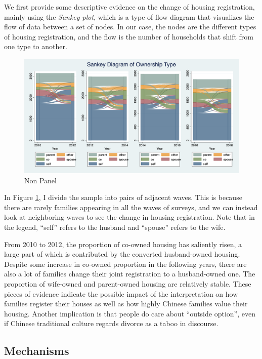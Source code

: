 \documentclass[11pt]{article}
\begin{document}
We first provide some descriptive evidence on the change of housing registration, mainly using the \textit{Sankey plot}, which is a type of flow diagram that visualizes the flow of data between a set of nodes. In our case, the nodes are the different types of housing registration, and the flow is the number of households that shift from one type to another.

\begin{figure}
    \centering
    \includegraphics[width = \textwidth]{./graphs_new/sankeyall_nonpanel.png}
    \caption{Non Panel}
    \label{fig:sankeyall_nonpanel}
\end{figure}

In Figure \ref{fig:sankeyall_nonpanel}, I divide the sample into pairs of adjacent waves. This is because there are rarely families appearing in all the waves of surveys, and we can instead look at neighboring waves to see the change in housing registration. Note that in the legend, ``self'' refers to the husband and ``spouse'' refers to the wife.

From 2010 to 2012, the proportion of co-owned housing has saliently risen, a large part of which is contributed by the converted husband-owned housing. Despite some increase in co-owned proportion in the following years, there are also a lot of families change their joint registration to a husband-owned one. The proportion of wife-owned and parent-owned housing are relatively stable. These pieces of evidence indicate the possible impact of the interpretation on how families register their houses as well as how highly Chinese families value their housing. Another implication is that people do care about ``outside option'', even if Chinese traditional culture regards divorce as a taboo in discourse.

\subsection{Mechanisms}
\end{document}
